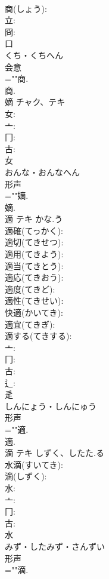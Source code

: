 \documentclass[8pt]{extreport}
\begin{document}
\begin{CJK}{UTF8}{min}
\\	商(しょう): 
\\	立: 
\\	冏: 
\\	口	
\\	くち・くちへん	
\\	会意 
\\	=""商.
\\	商.
\\	嫡	チャク、テキ			
\\	女: 
\\	亠: 
\\	冂: 
\\	古: 
\\	女	
\\	おんな・おんなへん	
\\	形声 
\\	=""嫡.
\\	嫡.
\\	適	テキ	かな.う		
\\	適確(てっかく): 
\\	適切(てきせつ): 
\\	適用(てきよう): 
\\	適当(てきとう): 
\\	適応(てきおう): 
\\	適度(てきど): 
\\	適性(てきせい): 
\\	快適(かいてき): 
\\	適宜(てきぎ): 
\\	適する(てきする): 
\\	亠: 
\\	冂: 
\\	古: 
\\	辶: 
\\	辵	
\\	しんにょう・しんにゅう	
\\	形声 
\\	=""適.
\\	適.
\\	滴	テキ	しずく、したた.る		
\\	水滴(すいてき): 
\\	滴(しずく): 
\\	水: 
\\	亠: 
\\	冂: 
\\	古: 
\\	水	
\\	みず・したみず・さんずい	
\\	形声 
\\	=""滴.

\end{CJK}
\end{document}

